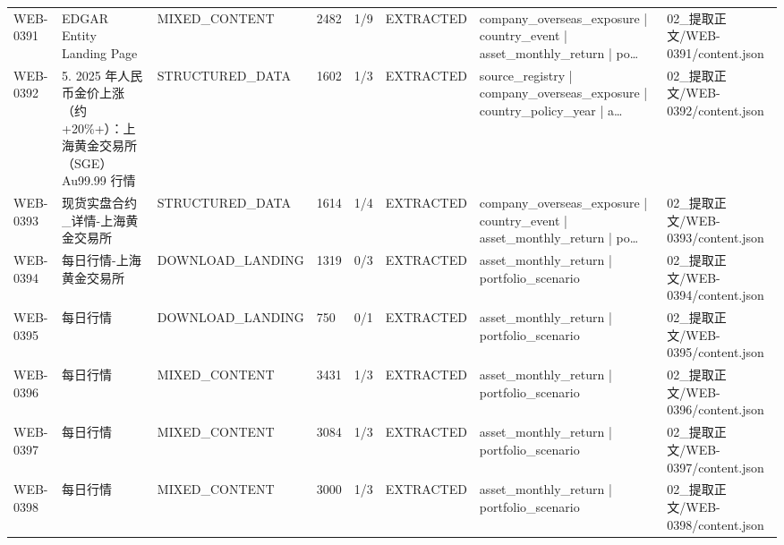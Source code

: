 \begin{landscape}
\begin{longtable}{p{1.8cm}p{4.2cm}p{3.0cm}p{1.4cm}p{1.6cm}p{2.4cm}p{4.2cm}p{4.2cm}}
WEB-0391 & EDGAR Entity Landing Page & MIXED\_\allowbreak{}CONTENT & 2482 & 1/\allowbreak{}9 & EXTRACTED & company\_\allowbreak{}overseas\_\allowbreak{}exposure | country\_\allowbreak{}event | asset\_\allowbreak{}monthly\_\allowbreak{}return | po… & 02\_\allowbreak{}提取正文/\allowbreak{}WEB-0391/\allowbreak{}content.json\\
WEB-0392 & 5. 2025 年人民币金价上涨（约 +20\%+）：上海黄金交易所（SGE）Au99.99 行情 & STRUCTURED\_\allowbreak{}DATA & 1602 & 1/\allowbreak{}3 & EXTRACTED & source\_\allowbreak{}registry | company\_\allowbreak{}overseas\_\allowbreak{}exposure | country\_\allowbreak{}policy\_\allowbreak{}year | a… & 02\_\allowbreak{}提取正文/\allowbreak{}WEB-0392/\allowbreak{}content.json\\
WEB-0393 & 现货实盘合约\_\allowbreak{}详情-上海黄金交易所 & STRUCTURED\_\allowbreak{}DATA & 1614 & 1/\allowbreak{}4 & EXTRACTED & company\_\allowbreak{}overseas\_\allowbreak{}exposure | country\_\allowbreak{}event | asset\_\allowbreak{}monthly\_\allowbreak{}return | po… & 02\_\allowbreak{}提取正文/\allowbreak{}WEB-0393/\allowbreak{}content.json\\
WEB-0394 & 每日行情-上海黄金交易所 & DOWNLOAD\_\allowbreak{}LANDING & 1319 & 0/\allowbreak{}3 & EXTRACTED & asset\_\allowbreak{}monthly\_\allowbreak{}return | portfolio\_\allowbreak{}scenario & 02\_\allowbreak{}提取正文/\allowbreak{}WEB-0394/\allowbreak{}content.json\\
WEB-0395 & 每日行情 & DOWNLOAD\_\allowbreak{}LANDING & 750 & 0/\allowbreak{}1 & EXTRACTED & asset\_\allowbreak{}monthly\_\allowbreak{}return | portfolio\_\allowbreak{}scenario & 02\_\allowbreak{}提取正文/\allowbreak{}WEB-0395/\allowbreak{}content.json\\
WEB-0396 & 每日行情 & MIXED\_\allowbreak{}CONTENT & 3431 & 1/\allowbreak{}3 & EXTRACTED & asset\_\allowbreak{}monthly\_\allowbreak{}return | portfolio\_\allowbreak{}scenario & 02\_\allowbreak{}提取正文/\allowbreak{}WEB-0396/\allowbreak{}content.json\\
WEB-0397 & 每日行情 & MIXED\_\allowbreak{}CONTENT & 3084 & 1/\allowbreak{}3 & EXTRACTED & asset\_\allowbreak{}monthly\_\allowbreak{}return | portfolio\_\allowbreak{}scenario & 02\_\allowbreak{}提取正文/\allowbreak{}WEB-0397/\allowbreak{}content.json\\
WEB-0398 & 每日行情 & MIXED\_\allowbreak{}CONTENT & 3000 & 1/\allowbreak{}3 & EXTRACTED & asset\_\allowbreak{}monthly\_\allowbreak{}return | portfolio\_\allowbreak{}scenario & 02\_\allowbreak{}提取正文/\allowbreak{}WEB-0398/\allowbreak{}content.json\\

\end{longtable}
\end{landscape}
